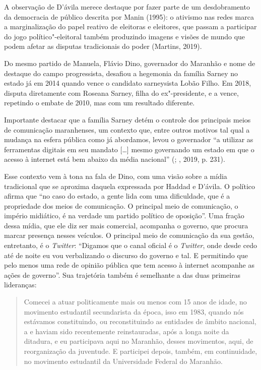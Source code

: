 A observação de D'ávila merece destaque por fazer parte de um
desdobramento da democracia de público descrita por Manin (1995): o
ativismo nas redes marca a marginalização do papel reativo de eleitoras
e eleitores, que passam a participar do jogo político"-eleitoral também
produzindo imagens e visões de mundo que podem afetar as disputas
tradicionais do poder (Martins, 2019).

Do mesmo partido de Manuela, Flávio Dino, governador do Maranhão e nome
de destaque do campo progressista, desafiou a hegemonia da família
Sarney no estado já em 2014 quando vence o candidato sarneysista Lobão
Filho. Em 2018, disputa diretamente com Roseana Sarney, filha do
ex"-presidente, e a vence, repetindo o embate de 2010, mas com um
resultado diferente.

Importante destacar que a família Sarney detém o controle dos principais
meios de comunicação maranhenses, um contexto que, entre outros motivos
tal qual a mudança na esfera pública como já abordamos, levou o
governador ``a utilizar as ferramentas digitais em seu mandato {[}\ldots{}{]}
mesmo governando um estado em que o acesso à internet está bem abaixo da
média nacional'' (; , 2019, p. 231).

Esse contexto vem à tona na fala de Dino, com uma visão sobre a mídia
tradicional que se aproxima daquela expressada por Haddad e D'ávila. O
político afirma que ``no caso do estado, a gente lida com uma
dificuldade, que é a propriedade dos meios de comunicação. O principal
meio de comunicação, o império midiático, é na verdade um partido
político de oposição''. Uma fração dessa mídia, que ele diz ser mais
comercial, acompanha o governo, que procura marcar presença nesses
veículos. O principal meio de comunicação da sua gestão, entretanto, é o
\emph{Twitter}: ``Digamos que o canal oficial é o \emph{Twitter}, onde
desde cedo até de noite eu vou verbalizando o discurso do governo e tal.
E permitindo que pelo menos uma rede de opinião pública que tem acesso à
internet acompanhe as ações de governo''. Sua trajetória também é
semelhante a das duas primeiras lideranças:

\begin{quote}
Comecei a atuar politicamente mais ou menos com 15 anos de idade, no
movimento estudantil secundarista da época, isso em 1983, quando nós
estávamos constituindo, ou reconstituindo as entidades de âmbito
nacional, a  e  haviam sido recentemente reinstauradas, após a
longa noite da ditadura, e eu participava aqui no Maranhão, desses
movimentos, aqui, de reorganização da juventude. E participei depois,
também, em continuidade, no movimento estudantil da Universidade Federal
do Maranhão.
\end{quote}

